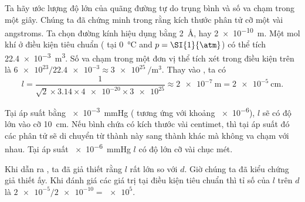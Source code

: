 Ta hãy ước lượng độ lớn của quãng đường tự do trụng bình và số va chạm trong một giây. Chúng ta đã chứng minh trong  rằng kích thước phân tử cỡ một vài angstroms. Ta chọn đường kính hiệu dụng bằng \SI{2}{\angstrom}, hay \SI{2e-10}{\metre}. Một mol khí ở điều kiện tiêu chuẩn ( tại \SI{0}{\degreeCelsius} and $p=\SI{1}{\atm}$) có thể tích \SI{22.4e-3}{\metre\cubed}. Số va chạm trong một đơn vị thể tích xét trong điều kiện trên là $\num{6e23}/\num{22.4e-3}\approx\SI{3e25}{\per\metre\cubed}$. Thay vào , ta có
\begin{equation*}
    l = \frac{1}{\sqrt{2}\times 3.14\times \num{4e-20}\times\num{3e25}} \approx \SI{2e-7}{\metre} = \SI{2e-5}{\centi\metre}.
\end{equation*}

Tại áp suất bằng \SI{e-3}{\mmHg} ( tương ứng với khoảng \SI{e-6}{\atm}), $l$ sẽ có độ lớn vào cỡ \SI{10}{\centi\metre}. Nếu bình chứa có kích thước vài centimet, thì tại áp suất đó các phân tử sẽ di chuyển từ thành này sang thành khác mà không va chạm với nhau. Tại áp suất \SI{e-6}{\mmHg} $l$ có độ lớn cỡ vài chục mét. 

Khi dẫn ra , ta đã giả thiết rằng $l$ rất lớn so với $d$. Giờ chúng ta đã kiểu chứng giả thiết ấy. Khi đánh giá các giá trị tại điều kiện tiêu chuẩn thì tỉ số của $l$ trên $d$ là $\num{2e-5}/\num{2e-10} = \num{e5}$.


